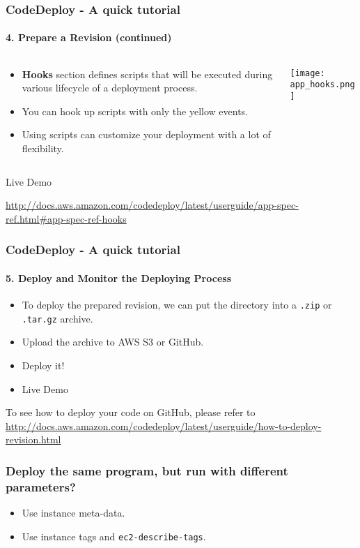 \documentclass[10pt]{beamer}
\begin{document}
\begin{frame}
    \frametitle{CodeDeploy - A quick tutorial}
    \framesubtitle{4. Prepare a Revision (continued)}

    \begin{columns}
        \begin{column}{0.4\textwidth}
    \begin{itemize}
        \item {\bf Hooks} section defines scripts that will be executed during various lifecycle of a deployment process.
        \item You can hook up scripts with only the yellow events. 
        \item Using scripts can customize your deployment with a lot of flexibility.
    \end{itemize}
    \end{column}
    \begin{column}{0.6\textwidth}
    \texttt{[image: app\_hooks.png]}
    \end{column}
    \end{columns}

    \vspace{0.1in}
    \pause
    Live Demo

    \vspace{0.1in}
    {\tiny \url{http://docs.aws.amazon.com/codedeploy/latest/userguide/app-spec-ref.html\#app-spec-ref-hooks}}
\end{frame}

\begin{frame}
    \frametitle{CodeDeploy - A quick tutorial}
    \framesubtitle{5. Deploy and Monitor the Deploying Process}
    \begin{itemize}
        \item To deploy the prepared revision, we can put the directory into a {\tt .zip} or {\tt .tar.gz} archive.
        \item Upload the archive to AWS S3 or GitHub.
        \item Deploy it!
        \pause
        \item Live Demo
    \end{itemize}

    {\tiny To see how to deploy your code on GitHub, please refer to \url{http://docs.aws.amazon.com/codedeploy/latest/userguide/how-to-deploy-revision.html}}
\end{frame}

\begin{frame}
    \frametitle{Deploy the same program, but run with different parameters?}
    \begin{itemize}
        \item Use instance meta-data.
        \item Use instance tags and {\tt ec2-describe-tags}.
    \end{itemize}
\end{frame}
\end{document}
